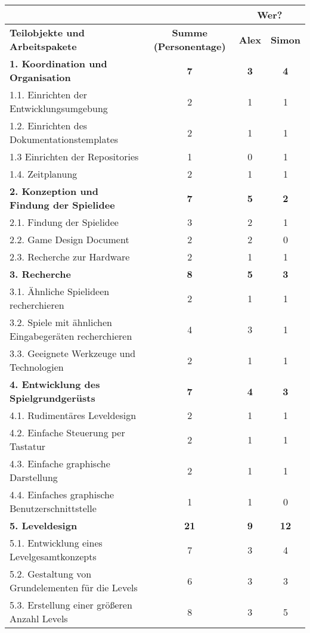 \begingroup
\small
\begin{tabularx}{\textwidth}{|X|c|c|c|} \hline
 &  & \multicolumn{2}{c|}{\textbf{Wer?}} \\ \hline
\textbf{Teilobjekte und Arbeitspakete} & \textbf{Summe (Personentage)} & \textbf{Alex} & \textbf{Simon} \\ \hline
\textbf{1. Koordination und Organisation} & \textbf{7} & \textbf{3} & \textbf{4} \\ \hline
1.1. Einrichten der Entwicklungsumgebung & 2 & 1 & 1 \\ \hline
1.2. Einrichten des Dokumentationstemplates & 2 & 1 & 1 \\ \hline
1.3 Einrichten der Repositories & 1 & 0 & 1 \\ \hline
1.4. Zeitplanung & 2 & 1 & 1 \\ \hline
\textbf{2. Konzeption und Findung der Spielidee} & \textbf{7} & \textbf{5} & \textbf{2} \\ \hline
2.1. Findung der Spielidee & 3 & 2 & 1 \\ \hline
2.2. Game Design Document & 2 & 2 & 0 \\ \hline
2.3. Recherche zur Hardware & 2 & 1 & 1 \\ \hline
\textbf{3. Recherche} & \textbf{8} & \textbf{5} & \textbf{3} \\ \hline
3.1. Ähnliche Spielideen recherchieren & 2 & 1 & 1 \\ \hline
3.2. Spiele mit ähnlichen Eingabegeräten recherchieren & 4 & 3 & 1 \\ \hline
3.3. Geeignete Werkzeuge und Technologien & 2 & 1 & 1 \\ \hline
\textbf{4. Entwicklung des Spielgrundgerüsts} & \textbf{7} & \textbf{4} & \textbf{3} \\ \hline
4.1. Rudimentäres Leveldesign & 2 & 1 & 1 \\ \hline
4.2. Einfache Steuerung per Tastatur & 2 & 1 & 1 \\ \hline
4.3. Einfache graphische Darstellung & 2 & 1 & 1 \\ \hline
4.4. Einfaches graphische Benutzerschnittstelle & 1 & 1 & 0 \\ \hline
\textbf{5. Leveldesign} & \textbf{21} & \textbf{9} & \textbf{12} \\ \hline
5.1. Entwicklung eines Levelgesamtkonzepts & 7 & 3 & 4 \\ \hline
5.2. Gestaltung von Grundelementen für die Levels & 6 & 3 & 3 \\ \hline
5.3. Erstellung einer größeren Anzahl Levels & 8 & 3 & 5 \\ \hline

\end{tabularx}
